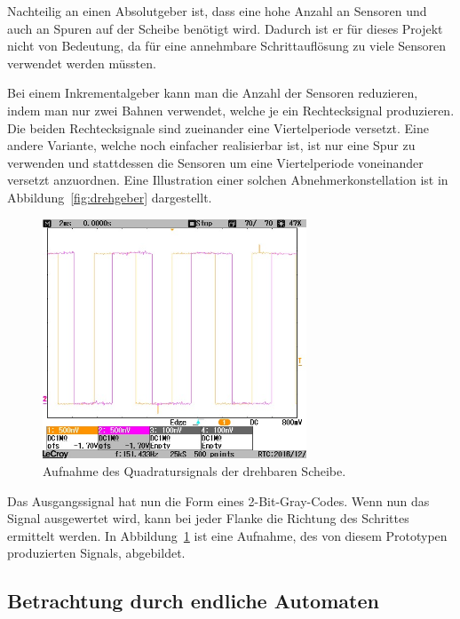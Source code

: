 Nachteilig an einen Absolutgeber ist, dass eine hohe Anzahl an Sensoren und auch an Spuren auf der Scheibe benötigt wird.
Dadurch ist er für dieses Projekt nicht von Bedeutung, da für eine annehmbare Schrittauflösung zu viele Sensoren verwendet werden müssten.

Bei einem Inkrementalgeber kann man die Anzahl der Sensoren reduzieren, indem man nur zwei Bahnen verwendet, welche je ein Rechtecksignal produzieren.
Die beiden Rechtecksignale sind zueinander eine Viertelperiode versetzt.
Eine andere Variante, welche noch einfacher realisierbar ist, ist nur eine Spur zu verwenden und stattdessen die Sensoren um eine Viertelperiode voneinander versetzt anzuordnen.
Eine Illustration einer solchen Abnehmerkonstellation ist in Abbildung~\ref{fig:drehgeber} dargestellt. \cite[333]{book:elektrischeMesstechnik}

\begin{figure}[!h] \centering
	\includegraphics[width=0.7\textwidth]{img/PicturesPlots/Encoder/Normal/COPY/CONVERT/SCRN0117_Cutted.jpg}
	\caption{Aufnahme des Quadratursignals der drehbaren Scheibe.}
	\label{fig:quadratureSignalNormal}
\end{figure}

Das Ausgangssignal hat nun die Form eines 2-Bit-Gray-Codes.
Wenn nun das Signal ausgewertet wird, kann bei jeder Flanke die Richtung des Schrittes ermittelt werden.
In Abbildung~\ref{fig:quadratureSignalNormal} ist eine Aufnahme, des von diesem Prototypen produzierten Signals, abgebildet.


\subsection{Betrachtung durch endliche Automaten}
\label{chap:aufbau:aufbauInkrementalgeberFSM}


